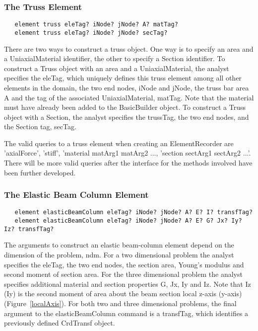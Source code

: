 \documentclass[12pt]{article}
\begin{document}
\subsubsection{The Truss Element}
{\sf\small
\begin{verbatim}
   element truss eleTag? iNode? jNode? A? matTag?
   element truss eleTag? iNode? jNode? secTag?
\end{verbatim}
}

\noindent There are two ways to construct a truss object. One way is
to specify an area and a UniaxialMaterial identifier, the other to specify a
Section identifier. To construct a Truss object with an area and a
UniaxialMaterial, the analyst specifies the eleTag, which uniquely defines
this truss element among all other elements in the domain, the two end
nodes, iNode and jNode, the truss bar area A and the tag of the
associated UniaxialMaterial, matTag. Note that the material must have already
been added to the BasicBuilder object. To construct a Truss object
with a Section, the analyst specifies the trussTag, the two end nodes,
and the Section tag, secTag. 

The valid queries to a truss element when creating an ElementRecorder
are 'axialForce', 'stiff', 'material matArg1 matArg2 ..., 'section sectArg1
sectArg2 ...'. There will be more valid queries after the interface
for the methods involved have been further developed.

\subsubsection{The Elastic Beam Column Element}
{\sf\small
\begin{verbatim}
   element elasticBeamColumn eleTag? iNode? jNode? A? E? I? transfTag?
   element elasticBeamColumn eleTag? iNode? jNode? A? E? G? Jx? Iy? Iz? transfTag?
\end{verbatim}
}

\noindent The arguments to construct an elastic beam-column element depend on
the dimension of the problem, ndm. For a two dimensional problem the
analyst specifies the eleTag, the two end nodes, the section area,
Young's modulus and second moment of section area. For the three dimensional
problem the analyst specifies additional material and
section properties G, Jx, Iy and Iz. Note that Iz (Iy) is the second
moment of area about the beam section local z-axis (y-axis)
(Figure~\ref{localAxis}). For both two and three dimensional problems,
the final argument to the elasticBeamColumn command is a transfTag,
which identifies a previously defined CrdTransf object. 
\end{document}
